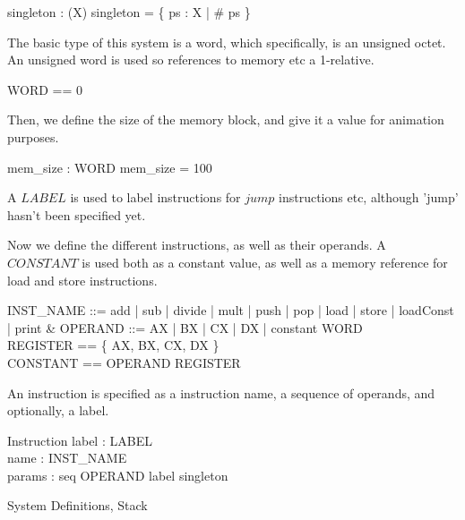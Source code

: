\begin{gendef}[X]
    singleton : \power (\power X)
\where
    singleton = \{ ps : \power X | \# ps  \}
\end{gendef}

The basic type of this system is a word, which specifically, is an
unsigned octet. An unsigned word is used so references to memory etc a
1-relative.

\begin{zed}
    WORD == 0 
\end{zed}

Then, we define the size of the memory block, and give it a value for
animation purposes.

\begin{axdef}
    mem\_size : WORD
\where
    mem\_size = 100
\end{axdef}

A $LABEL$ is used to label instructions for $jump$ instructions etc,
although 'jump' hasn't been specified yet.

\begin{zed}
    [LABEL]
\end{zed}

Now we define the different instructions, as well as their operands. A
$CONSTANT$ is used both as a constant value, as well as a memory
reference for load and store instructions.

\begin{zed}
    INST\_NAME ::= add | sub | divide | mult | push | pop | load | store | loadConst | print &
    OPERAND ::= AX | BX | CX | DX | constant \ldata WORD \rdata\\
    REGISTER == \{ AX, BX, CX, DX \}\\
    CONSTANT == OPERAND \setminus REGISTER
\end{zed}

An instruction is specified as a instruction name, a sequence of
operands, and optionally, a label.

\begin{schema}{Instruction}
    label : \power LABEL\\
    name : INST\_NAME\\
    params : seq OPERAND
\where
    label \in singleton
\end{schema}

\begin{zsection}
  \SECTION System \parents Definitions, Stack
\end{zsection}

